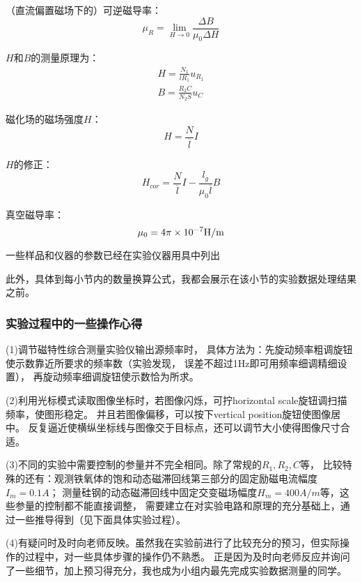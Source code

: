 \documentclass[11pt]{article}
\begin{document}
（直流偏置磁场下的）可逆磁导率：
\begin{equation*}
    \mu_R = \lim_{H\rightarrow 0}\frac{\Delta B}{\mu_{0}\Delta H}
\end{equation*}

$H$和$B$的测量原理为：
\begin{gather*}
    H = \frac{N_1}{l R_1}u_{R_1}\\
    B = \frac{R_2 C}{N_2 S}u_C
\end{gather*}

磁化场的磁场强度$H$：
\begin{equation*}
    H = \frac{N}{\overline{l}}I
\end{equation*}

$H$的修正：
\begin{equation*}
    H_{cor} = \frac{N}{\overline{l}}I-\frac{l_g}{\mu_0\overline{l}}B
\end{equation*}

真空磁导率：
\[
    \mu_0 = 4\pi\times 10^{-7}{\rm H/m}
\]

一些样品和仪器的参数已经在实验仪器用具中列出

此外，具体到每小节内的数量换算公式，我都会展示在该小节的实验数据处理结果之前。

\subsubsection{实验过程中的一些操作心得}

(1)调节磁特性综合测量实验仪输出源频率时，
具体方法为：先旋动频率粗调旋钮使示数靠近所要求的频率数（实验发现，
误差不超过1Hz即可用频率细调精细设置），
再旋动频率细调旋钮使示数恰为所求。

(2)利用光标模式读取图像坐标时，若图像闪烁，可拧horizontal scale旋钮调扫描频率，使图形稳定。
并且若图像偏移，可以按下vertical position旋钮使图像居中。
反复逼近使横纵坐标线与图像交于目标点，还可以调节大小使得图像尺寸合适。

(3)不同的实验中需要控制的参量并不完全相同。除了常规的$R_1,R_2,C$等，
比较特殊的还有：观测铁氧体的饱和动态磁滞回线第三部分的固定励磁电流幅度$I_m=0.1A$；
测量硅钢的动态磁滞回线中固定交变磁场幅度$H_m=400 A/m$等，这些参量的控制都不能直接调整，
需要建立在对实验电路和原理的充分基础上，通过一些推导得到（见下面具体实验过程）。

(4)有疑问时及时向老师反映。虽然我在实验前进行了比较充分的预习，但实际操作的过程中，对一些具体步骤的操作仍不熟悉。
正是因为及时向老师反应并询问了一些细节，加上预习得充分，我也成为小组内最先完成实验数据测量的同学。
\end{document}
